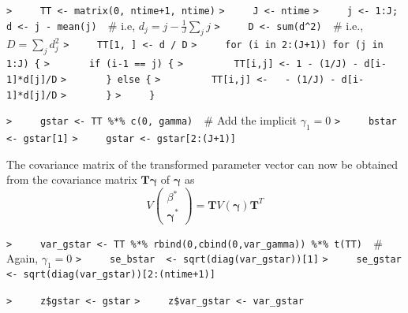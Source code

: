 \documentclass[a4paper]{article}
\begin{document}
\verb~>     TT <- matrix(0, ntime+1, ntime)~\newline
\verb~>     J <- ntime~\newline
\verb~>     j <- 1:J; d <- j - mean(j)  ~{\sffamily\# i.e, $ d_j = j-\frac{1}{J}\sum_j j$}\newline
\verb~>     D <- sum(d^2)  ~{\sffamily\# i.e., $ D = \sum_j d_j^2$}\newline
\verb~>     TT[1, ] <- d / D~\newline
\verb~>     for (i in 2:(J+1)) for (j in 1:J) {~\newline
\verb~>       if (i-1 == j) {~\newline
\verb~>         TT[i,j] <- 1 - (1/J) - d[i-1]*d[j]/D~\newline
\verb~>       } else {~\newline
\verb~>         TT[i,j] <-   - (1/J) - d[i-1]*d[j]/D~\newline
\verb~>       }~\newline
\verb~>     }~\par

\verb~>     gstar <- TT %*% c(0, gamma)  ~{\sffamily\# Add the implicit $\gamma_1=0$}\newline
\verb~>     bstar <- gstar[1]~\newline
\verb~>     gstar <- gstar[2:(J+1)]~\par

The covariance matrix of the transformed parameter vector can now be obtained
from the covariance matrix $\mathbf{T}\boldsymbol{\gamma}$ of $\boldsymbol{\gamma}$ as
\begin{equation}
  V\left( \begin{array} {c} \beta^* \\\boldsymbol{\gamma}^* \end{array} \right)
  = \mathbf{T}V(\boldsymbol{\gamma})\mathbf{T}^T
\end{equation}\par

\verb~>     var_gstar <- TT %*% rbind(0,cbind(0,var_gamma)) %*% t(TT)  ~{\sffamily\# Again, $\gamma_1=0$}\newline
\verb~>     se_bstar  <- sqrt(diag(var_gstar))[1]~\newline
\verb~>     se_gstar  <- sqrt(diag(var_gstar))[2:(ntime+1)]~\par

\verb~>     z$gstar <- gstar~\newline
\verb~>     z$var_gstar <- var_gstar~\par
\end{document}
